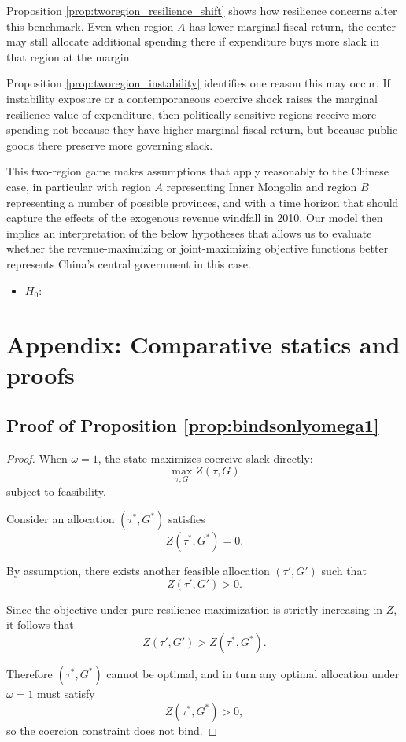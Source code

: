 \documentclass[12pt]{article}
\begin{document}
Proposition \ref{prop:tworegion_resilience_shift} shows how resilience concerns alter this benchmark. Even when region $A$ has lower marginal fiscal return, the center may still allocate additional spending there if expenditure buys more slack in that region at the margin.

Proposition \ref{prop:tworegion_instability} identifies one reason this may occur. If instability exposure or a contemporaneous coercive shock raises the marginal resilience value of expenditure, then politically sensitive regions receive more spending not because they have higher marginal fiscal return, but because public goods there preserve more governing slack.

This two-region game makes assumptions that apply reasonably to the Chinese case, in particular with region $A$ representing Inner Mongolia and region $B$ representing a number of possible provinces, and with a time horizon that should capture the effects of the exogenous revenue windfall in 2010. Our model then implies an interpretation of the below hypotheses that allows us to evaluate whether the revenue-maximizing or joint-maximizing objective functions better represents China's central government in this case.

\begin{itemize}
    \item $H_0$: 
\end{itemize}

\section*{Appendix: Comparative statics and proofs}

\subsection{Proof of Proposition \ref{prop:bindsonlyomega1}}

\begin{proof}
When \(\omega=1\), the state maximizes coercive slack directly:
\[
\max_{\tau,G} Z(\tau,G)
\]
subject to feasibility.

Consider an allocation \((\tau^*,G^*)\) satisfies
\[\label{eq:Ztaustar}
Z(\tau^*,G^*)=0.
\]

By assumption, there exists another feasible allocation \((\tau',G')\) such that
\[
Z(\tau',G')>0.
\]

Since the objective under pure resilience maximization is strictly increasing in \(Z\), it follows that
\[
Z(\tau',G') > Z(\tau^*,G^*).
\]

Therefore \((\tau^*,G^*)\) cannot be optimal, and in turn any optimal allocation under \(\omega=1\) must satisfy
\[
Z(\tau^*,G^*)>0,
\]
so the coercion constraint does not bind.
\end{proof}
\end{document}
